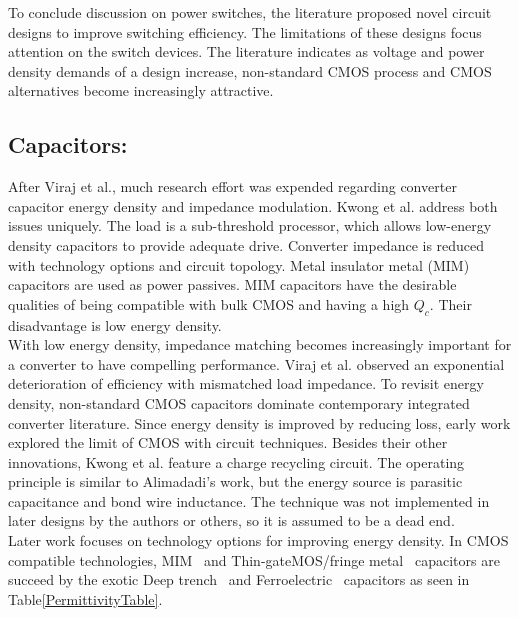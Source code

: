 \documentclass[letterpaper,twocolumn,10pt]{article}
\begin{document}
\indent To conclude discussion on power switches, the literature proposed novel circuit designs to improve switching efficiency. The limitations of these designs focus attention on the switch devices. The literature indicates as voltage and power density demands of a design increase, non-standard CMOS process and CMOS alternatives become increasingly attractive.\\
\subsection{Capacitors: }After Viraj et al.\cite{Viraj2007}, much research effort was expended regarding converter capacitor energy density and impedance modulation. Kwong et al.\cite{Kwong2009} address both issues uniquely. The load is a sub-threshold processor, which allows low-energy density capacitors to provide adequate drive. Converter impedance is reduced with technology options and circuit topology. Metal insulator metal (MIM) capacitors are used as power passives. MIM capacitors have the desirable qualities of being compatible with bulk CMOS and having a high $Q_c$. Their disadvantage is low energy density.\\
With low energy density, impedance matching becomes increasingly important for a converter to have compelling performance. Viraj et al.\cite{Viraj2007} observed an exponential deterioration of efficiency with mismatched load impedance. %
\indent To revisit energy density, non-standard CMOS capacitors dominate contemporary integrated converter literature. Since energy density is improved by reducing loss, early work explored the limit of CMOS with circuit techniques. Besides their other innovations, Kwong et al.\cite{Kwong2009} feature a charge recycling circuit. The operating principle is similar to Alimadadi's work\cite{Alimadadi2008}, but the energy source is parasitic capacitance and bond wire inductance. The technique was not implemented in later designs by the authors or others, so it is assumed to be a dead end.\\
\indent Later work focuses on technology options for improving energy density. In CMOS compatible technologies, MIM~\cite{Kwong2009} and Thin-gateMOS/fringe metal~\cite{Pique2012} capacitors are succeed by the exotic Deep trench~\cite{Pique} and Ferroelectric~\cite{Damak2013} capacitors as seen in Table\ref{PermittivityTable}.\\
\end{document}
